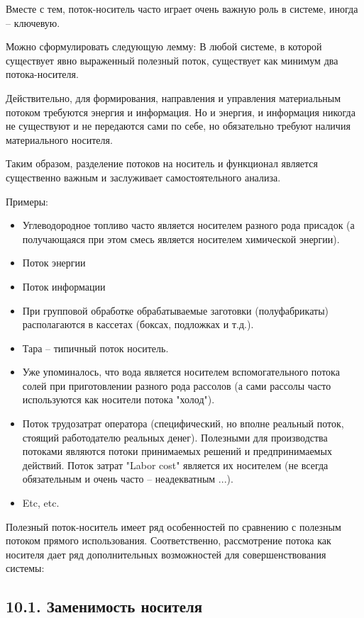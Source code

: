 \documentclass[a4paper,11pt]{article}
\begin{document}
Вместе с тем, поток-носитель часто играет очень важную роль в системе, иногда
-- ключевую.

Можно сформулировать следующую лемму: В любой системе, в которой существует
явно выраженный полезный поток, существует как минимум два потока-носителя.

Действительно, для формирования, направления и управления материальным потоком
требуются энергия и информация. Но и энергия, и информация никогда не
существуют и не передаются сами по себе, но обязательно требуют наличия
материального носителя.

Таким образом, разделение потоков на носитель и функционал является
существенно важным и заслуживает самостоятельного анализа.

Примеры:
\begin{itemize}
\item Углеводородное топливо часто является носителем разного рода присадок (а
  получающаяся при этом смесь является носителем химической энергии).
\item Поток энергии
\item Поток информации
\item При групповой обработке обрабатываемые заготовки (полуфабрикаты)
  располагаются в кассетах (боксах, подложках и т.д.).
\item Тара -- типичный поток носитель.
\item Уже упоминалось, что вода является носителем вспомогательного потока
  солей при приготовлении разного рода рассолов (а сами рассолы часто
  используются как носители потока "холод").
\item Поток трудозатрат оператора (специфический, но вполне реальный поток,
  стоящий работодателю реальных денег). Полезными для производства потоками
  являются потоки принимаемых решений и предпринимаемых действий. Поток затрат
  "Labor cost" является их носителем (не всегда обязательным и очень часто --
  неадекватным ...).
\item Etc, etc.
\end{itemize}
Полезный поток-носитель имеет ряд особенностей по сравнению с полезным потоком
прямого использования. Соответственно, рассмотрение потока как носителя дает
ряд дополнительных возможностей для совершенствования системы:

\subsection{10.1.  Заменимость носителя}
\end{document}
